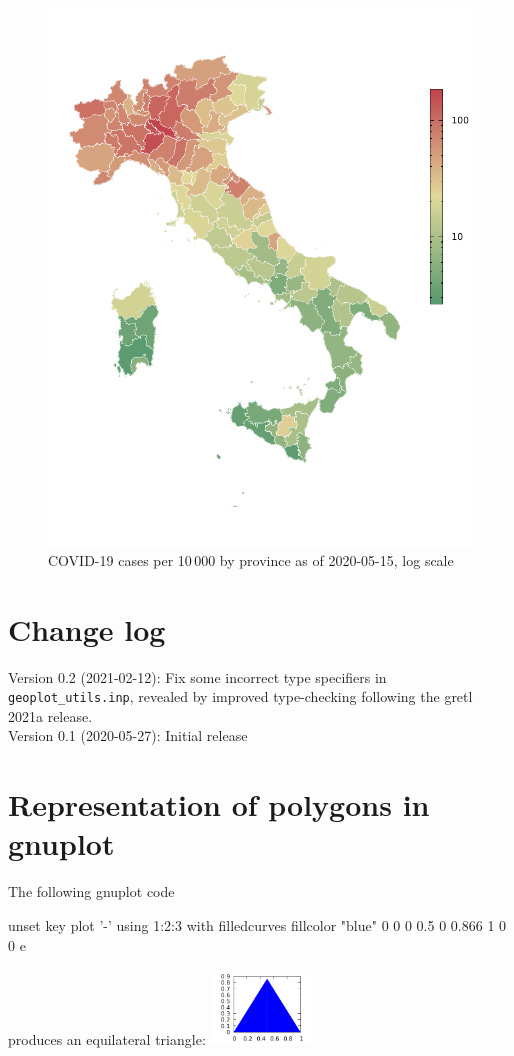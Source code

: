 \documentclass{article}
\newcommand{\startappendices}{%
\newcounter{appcount}
\setcounter{appcount}{0}
\renewcommand{\thesection}{Appendix \Alph{appcount}}}
\newcommand{\myappendix}[1]{%
\addtocounter{appcount}{1}
\section{#1}}
\begin{document}
\begin{figure}[p]
  \centering
  \includegraphics{covid.pdf}
  \caption{COVID-19 cases per 10\,000 by province as of
    2020-05-15, log scale}
  \label{fig:ita-covid}
\end{figure}

\section{Change log}

Version 0.2 (2021-02-12): Fix some incorrect type specifiers in
\verb|geoplot_utils.inp|, revealed by improved type-checking following
the gretl 2021a release. \\[6pt]
Version 0.1 (2020-05-27): Initial release

\clearpage
\startappendices

\myappendix{Representation of polygons in gnuplot}
\label{sec:gnuplot}

The
following \textsf{gnuplot} code
\begin{code}
  unset key
  plot '-' using 1:2:3 with filledcurves fillcolor "blue"
  0 0 0
  0.5 0 0.866
  1 0 0
  e
\end{code}
produces an equilateral triangle: \includegraphics[height=2cm]{triangle.pdf}
\end{document}
